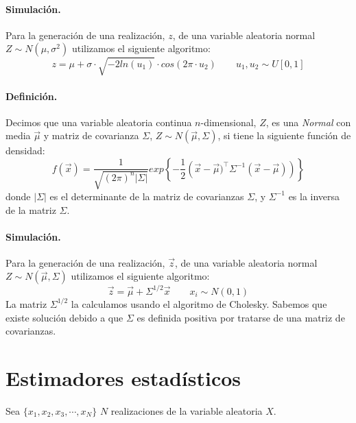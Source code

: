 \paragraph{Simulaci\'on.} Para la generaci\'on de una realizaci\'on, $z$, de 
una variable aleatoria normal $Z \sim N(\mu, \sigma^2)$ utilizamos el siguiente 
algoritmo:
\begin{displaymath}
z = \mu + \sigma\cdot \sqrt{-2 ln(u_1)} \cdot cos(2 \pi \cdot u_2)
\qquad u_1, u_2 \sim U[0,1]
\end{displaymath}

\paragraph{Definici\'on.} Decimos que una variable aleatoria continua 
$n$-dimensional, $Z$, es una \emph{Normal} con media $\vec{\mu}$
y matriz de covarianza $\Sigma$, $Z \sim N(\vec{\mu}, \Sigma)$, si tiene la
siguiente funci\'on de densidad:
\begin{displaymath}
f(\vec{x}) = \frac{1}{\sqrt{(2 \pi)^n \left| \Sigma \right|}}
exp\left\{-\frac{1}{2}\left(\vec{x}-\vec{\mu})^{\top} \Sigma^{-1} (\vec{x}-\vec{\mu}) \right)\right\}
\end{displaymath}
donde $\left|\Sigma\right|$ es el determinante de la matriz de covarianzas 
$\Sigma$, y $\Sigma^{-1}$ es la inversa de la matriz $\Sigma$.

\paragraph{Simulaci\'on.} Para la generaci\'on de una realizaci\'on, $\vec{z}$, 
de una variable aleatoria normal $Z \sim N(\vec{\mu}, \Sigma)$ utilizamos el 
siguiente algoritmo:
\begin{displaymath}
\vec{z} = \vec{\mu} + \Sigma^{1/2} \vec{x}
\qquad x_i \sim N(0,1)
\end{displaymath}
La matriz $\Sigma^{1/2}$ la calculamos usando el algoritmo de Cholesky. Sabemos 
que existe soluci\'on debido a que $\Sigma$ es definida positiva por tratarse
de una matriz de covarianzas.


\section{Estimadores estad\'isticos}
\label{apendix:estim}

Sea $\{x_1,x_2,x_3,\cdots,x_N\}$ $N$ realizaciones de la variable aleatoria
$X$.


